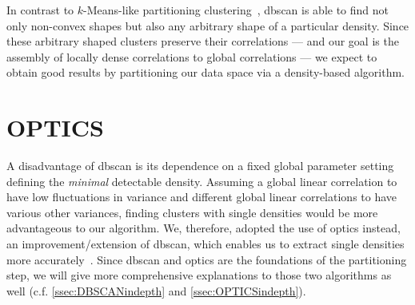 In contrast to $k$-Means-like partitioning clustering~\cite{kmeansmacqueen1967some}, \gls{dbscan} is able to find not only non-convex shapes but also any arbitrary shape of a particular density. Since these arbitrary shaped clusters preserve their correlations --- and our goal is the assembly of locally dense correlations to global correlations --- we expect to obtain good results by partitioning our data space via a density-based algorithm.

\section{OPTICS}\label{sec:OPTICSintro}
A disadvantage of \gls{dbscan} is its dependence on a fixed global parameter setting defining the \textit{minimal} detectable density. Assuming a global linear correlation to have low fluctuations in variance and different global linear correlations to have various other variances, finding clusters with single densities would be more advantageous to our algorithm. We, therefore, adopted the use of \gls{optics} instead, an improvement/extension of \gls{dbscan}, which enables us to extract single densities more accurately~\cite{opticsankerst1999optics}. Since \gls{dbscan} and \gls{optics} are the foundations of the partitioning step, we will give more comprehensive explanations to those two algorithms as well (c.f. \autoref{ssec:DBSCANindepth} and \autoref{ssec:OPTICSindepth}).

    
